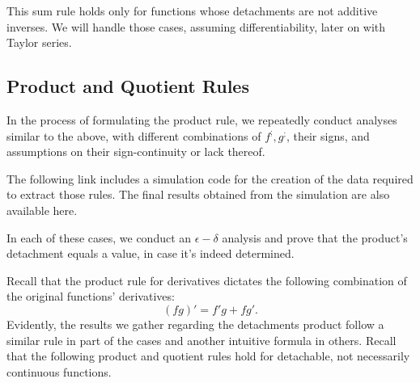 \documentclass[11pt]{book}
\begin{document}
This sum rule holds only for functions whose detachments are not additive inverses. We will handle those cases, assuming differentiability, later on with Taylor series.

\subsection{Product and Quotient Rules}
In the process of formulating the product rule, we repeatedly conduct analyses similar to the above, with different combinations of $f^{;},g^{;}$, their signs, and assumptions on their sign-continuity or lack thereof.

The following link includes a simulation code for the creation of the data required to extract those rules. The final results obtained from the simulation are also available here.

In each of these cases, we conduct an $\epsilon-\delta$ analysis and prove that the product's detachment equals a value, in case it's indeed determined.

Recall that the product rule for derivatives dictates the following combination of the original functions' derivatives: $$\left(fg\right)'=f'g+fg'.$$ Evidently, the results we gather regarding the detachments product follow a similar rule in part of the cases and another intuitive formula in others. Recall that the following product and quotient rules hold for detachable, not necessarily continuous functions.
\end{document}
